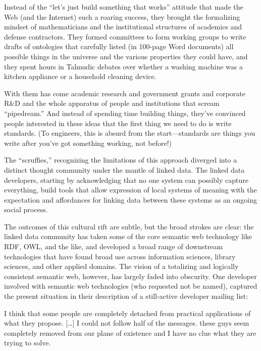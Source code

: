 \documentclass[10pt]{article}
\begin{document}
\begin{multicols}{2}
\begin{leftbar}
Instead of the ``let's just build something that works'' attitude that
made the Web (and the Internet) such a roaring success, they brought the
formalizing mindset of mathematicians and the institutional structures
of academics and defense contractors. They formed committees to form
working groups to write drafts of ontologies that carefully listed (in
100-page Word documents) all possible things in the universe and the
various properties they could have, and they spent hours in Talmudic
debates over whether a washing machine was a kitchen appliance or a
household cleaning device.

With them has come academic research and government grants and corporate
R\&D and the whole apparatus of people and institutions that scream
``pipedream.'' And instead of spending time building things, they've
convinced people interested in these ideas that the first thing we need
to do is write standards. (To engineers, this is absurd from the
start---standards are things you write after you've got something
working, not before!) \cite{swartzAaronSwartzProgrammable2013} 
\end{leftbar}

The ``scruffies,'' recognizing the limitations of this approach diverged
into a distinct thought community under the mantle of linked data. The
linked data developers, starting by acknowledging that no one system can
possibly capture everything, build tools that allow expression of local
systems of meaning with the expectation and affordances for linking data
between these systems as an ongoing social process.

The outcomes of this cultural rift are subtle, but the broad strokes are
clear: the linked data community has taken some of the core semantic web
technology like RDF, OWL, and the like, and developed a broad range of
downstream technologies that have found broad use across information
sciences, library sciences, and other applied domains. The vision of a
totalizing and logically consistent semantic web, however, has largely
faded into obscurity. One developer involved with semantic web
technologies (who requested not be named), captured the present
situation in their description of a still-active developer mailing list:

\begin{leftbar}
I think that some people are completely detached from practical
applications of what they propose. {[}\ldots{]} I could not follow half
of the messages. these guys seem completely removed from our plane of
existence and I have no clue what they are trying to solve.
\end{leftbar}


\end{multicols}
\end{document}
